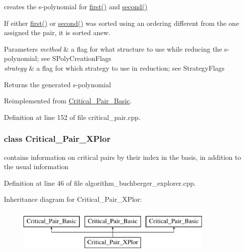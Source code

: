creates the s-\/polynomial for \hyperlink{group___g_b_computation_a6e251e3724fde2c610d921f93889eb67}{first()} and \hyperlink{group___g_b_computation_a06da1cbbe1451962b68f2bbf90855fae}{second()} 

If either \hyperlink{group___g_b_computation_a6e251e3724fde2c610d921f93889eb67}{first()} or \hyperlink{group___g_b_computation_a06da1cbbe1451962b68f2bbf90855fae}{second()} was sorted using an ordering different from the one assigned the pair, it is sorted anew. 
\begin{DoxyParams}{Parameters}
{\em method} & a flag for what structure to use while reducing the s-\/polynomial; see S\+Poly\+Creation\+Flags \\
\hline
{\em strategy} & a flag for which strategy to use in reduction; see Strategy\+Flags \\
\hline
\end{DoxyParams}
\begin{DoxyReturn}{Returns}
the generated s-\/polynomial 
\end{DoxyReturn}


Reimplemented from \hyperlink{group___g_b_computation_aedcb486aa7298a6ed5a1980890df0780}{Critical\+\_\+\+Pair\+\_\+\+Basic}.



Definition at line 152 of file critical\+\_\+pair.\+cpp.

\label{class_critical___pair___x_plor}
\subsubsection{class Critical\+\_\+\+Pair\+\_\+\+X\+Plor}
contains information on critical pairs by their index in the basis, in addition to the usual information 

Definition at line 46 of file algorithm\+\_\+buchberger\+\_\+explorer.\+cpp.

Inheritance diagram for Critical\+\_\+\+Pair\+\_\+\+X\+Plor\+:\begin{figure}[H]
\begin{center}
\leavevmode
\includegraphics[height=2.000000cm]{group___g_b_computation}
\end{center}
\end{figure}
